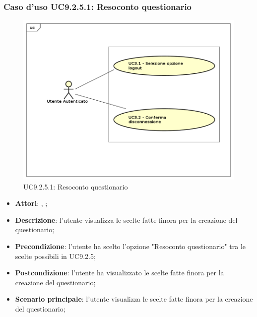 			\subsubsection{Caso d'uso UC9.2.5.1: Resoconto questionario}
			\label{UC9.2.5.1}
			\begin{figure}[h]
				\centering
			\includegraphics[scale=0.5,keepaspectratio]{UML/UC9.png}
				\caption{UC9.2.5.1: Resoconto questionario}
			\end{figure}
			\FloatBarrier
			\begin{itemize}
				\item \textbf{Attori}: \uau, \uaupro;
				\item \textbf{Descrizione}: l'utente visualizza le scelte fatte finora per la creazione del questionario;
				\item \textbf{Precondizione}: l'utente ha scelto l'opzione "Resoconto questionario" tra le scelte possibili in UC9.2.5;
				\item \textbf{Postcondizione}: l'utente ha visualizzato le scelte fatte finora per la creazione del questionario;
				\item \textbf{Scenario principale}: l'utente visualizza le scelte fatte finora per la creazione del questionario;
			\end{itemize}
			
